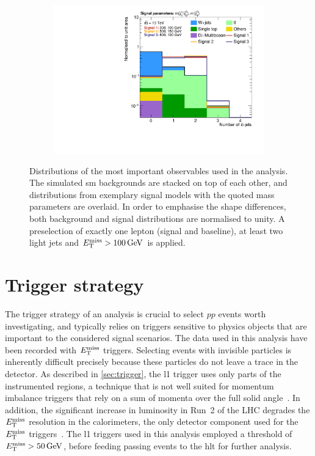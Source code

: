 \begin{figure}
\begin{subfigure}[b]{0.49\linewidth}
		\centering\includegraphics[width=\textwidth]{presel/nBJet}
		\caption{\label{fig:norm_nbjet}}
	\end{subfigure}
	\caption{Distributions of the most important observables used in the analysis. The simulated \gls{sm} backgrounds are stacked on top of each other, and distributions from exemplary signal models with the quoted mass parameters are overlaid. In order to emphasise the shape differences, both background and signal distributions are normalised to unity. A preselection of exactly one lepton (signal and baseline), at least two light jets and $\etmiss > \SI{100}{\GeV}$ is applied.}\label{fig:norm_obs}
\end{figure}

\section{Trigger strategy}\label{sec:trigger_strategy}

The trigger strategy of an analysis is crucial to select $pp$ events worth investigating, and typically relies on triggers sensitive to physics objects that are important to the considered signal scenarios. The data used in this analysis have been recorded with $E_{\textrm{T}}^{\textrm{miss}}$ triggers. Selecting events with invisible particles is inherently difficult precisely because these particles do not leave a trace in the detector. As described in \cref{sec:trigger}, the \gls{l1} trigger uses only parts of the instrumented regions, a technique that is not well suited for momentum imbalance triggers that rely on a sum of momenta over the full solid angle~\cite{Aad:2020les}. In addition, the significant increase in luminosity in Run~2 of the LHC degrades the $E_{\textrm{T}}^{\textrm{miss}}$ resolution in the calorimeters, the only detector component used for the $E_{\textrm{T}}^{\textrm{miss}}$ triggers~\cite{Aad:2020les}. The \gls{l1} triggers used in this analysis employed a threshold of $\etmiss > \SI{50}{\GeV}$, before feeding passing events to the \gls{hlt} for further analysis. 


